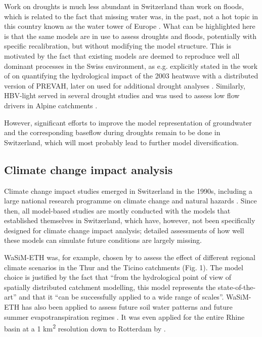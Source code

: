 \documentclass[10pt,a4paper]{article}
\begin{document}
Work on droughts is much less abundant in Switzerland than work on
floods, which is related to the fact that missing water was, in the
past, not a hot topic in this country known as the water tower of
Europe \citep{Milano2015}. What can be highlighted here is that the same
models are in use to assess droughts and floods, potentially with
specific recalibration, but without modifying the model structure. This
is motivated by the fact that existing models are deemed to reproduce
well all dominant processes in the Swiss environment, as e.g. explicitly
stated in the work of \citet{Zappa2007a} on quantifying the hydrological
impact of the 2003 heatwave with a distributed version of PREVAH, later
on used for additional drought analyses \citep{Brunner2019,Zappa2019}. Similarly,
HBV-light served in several drought studies \citep{Staudinger2014,Staudinger2014a,Staudinger2015} 
and was used to assess low flow drivers in Alpine catchments \citep{Arnoux_2020}.

However, significant efforts to improve the model representation of
groundwater and the corresponding baseflow during droughts remain to be
done in Switzerland, which will most probably lead to further model
diversification.

\subsection{Climate change impact analysis}
\label{sec:application:climatechange}

Climate change impact studies emerged in Switzerland in the 1990s,
including a large national research programme on climate change and
natural hazards \citep{snfs}. Since then, all model-based studies
are mostly conducted with the models that established themselves in
Switzerland, which have, however, not been specifically designed for
climate change impact analysis; detailed assessments of how well these
models can simulate future conditions are largely missing.

WaSiM-ETH was, for example, chosen by \citet{Jasper2004} to assess the
effect of different regional climate scenarios in the Thur and the
Ticino catchments (Fig. 1). The model choice is justified by the fact
that ``from the hydrological point of view of spatially distributed
catchment modelling, this model represents the state-of-the-art'' and
that it ``can be successfully applied to a wide range of scales''. 
WaSiM-ETH has also been applied to assess future soil water
patterns \citep{Jasper2006,Rossler2012} and future summer evapotranspiration
regimes \citep{Calanca2006}. It was even applied for the entire Rhine
basin at a 1 km\textsuperscript{2} resolution down to Rotterdam
by \citet{Kleinn_2005}.
\end{document}
